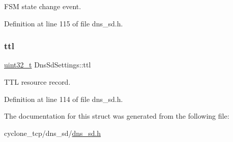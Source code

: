 F\+SM state change event. 



Definition at line 115 of file dns\+\_\+sd.\+h.

\mbox{\label{structDnsSdSettings_aff4d040c3aaa0aec91652624a1bd5e2d}} 
\subsubsection{\texorpdfstring{ttl}{ttl}}
{\footnotesize\ttfamily \hyperlink{stdint_8h_a435d1572bf3f880d55459d9805097f62}{uint32\+\_\+t} Dns\+Sd\+Settings\+::ttl}



T\+TL resource record. 



Definition at line 114 of file dns\+\_\+sd.\+h.



The documentation for this struct was generated from the following file\+:\begin{DoxyCompactItemize}
\item 
cyclone\+\_\+tcp/dns\+\_\+sd/\hyperlink{dns__sd_8h}{dns\+\_\+sd.\+h}\end{DoxyCompactItemize}

